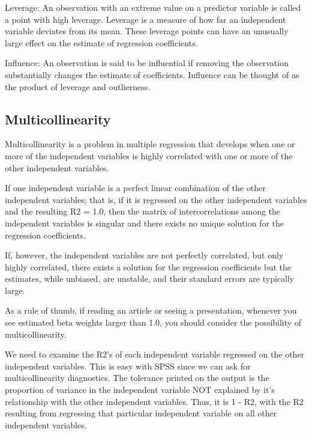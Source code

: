  

Leverage: An observation with an extreme value on a predictor variable is called a point with high leverage. Leverage is a measure of how far an independent variable deviates from its mean. These leverage points can have an unusually large effect on the estimate of regression coefficients.

 

Influence: An observation is said to be influential if removing the observation substantially changes the estimate of coefficients. Influence can be thought of as the product of leverage and outlierness.

\subsection*{Multicollinearity} 

Multicollinearity is a problem in multiple regression that develops when one or more of the independent variables is highly correlated with one or more of the other independent variables. 


If one independent variable is a perfect linear combination of the other independent variables; that is, if it is regressed on the other independent variables and the resulting R2 = 1.0, then the matrix of intercorrelations among the independent variables is singular and there exists no unique solution for the regression coefficients.


If, however, the independent variables are not perfectly correlated, but only highly correlated, there exists a solution for the regression coefficients but the estimates, while unbiased, are unstable, and their standard errors are typically large. 


As a rule of thumb, if reading an article or seeing a presentation, whenever you see estimated beta weights larger than 1.0, you should consider the possibility of multicollinearity.


We need to examine the R2's of each independent variable regressed on the other independent variables. This is easy with SPSS since we can ask for multicollinearity diagnostics. The tolerance printed on the output is the proportion of variance in the independent variable NOT explained by it's relationship with the other independent variables. Thus, it is 1 - R2, with the R2 resulting from regressing that particular independent variable on all other independent variables.




